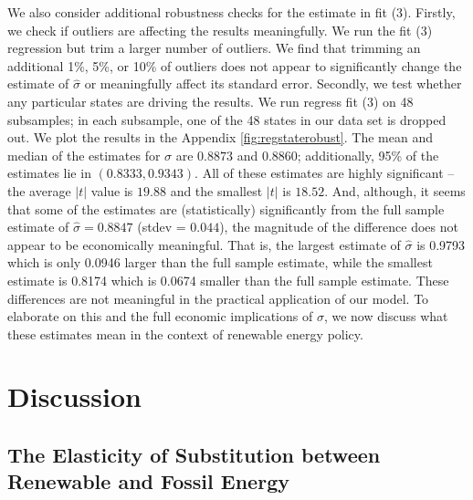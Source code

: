 \documentclass[11pt,a4paper,leqno]{extarticle}
\providecommand{\DIFdelend}{} %
\begin{document}
	\DIFdelend We also consider additional robustness checks for the estimate in fit (3). Firstly, we check if outliers are affecting the results meaningfully. We run the fit (3) regression but trim a larger number of outliers. We find that trimming an additional 1\%, 5\%, or 10\% of outliers does not appear to significantly change the estimate of $\hat{\sigma}$ or meaningfully affect its standard error. Secondly, we test whether any particular states are driving the results. We run regress fit (3) on 48 subsamples; in each subsample, one of the 48 states in our data set is dropped out. We plot the results in the Appendix \autoref{fig:regstaterobust}. The mean and median of the estimates for $\sigma$ are  $0.8873$ and $0.8860$; additionally, 95\% of the estimates lie in $(0.8333, 0.9343)$. All of these estimates are highly significant -- the average $|t|$ value is $19.88$ and the smallest $|t|$ is $18.52$. And, although, it seems that some of the estimates are (statistically) significantly  from the full sample estimate of $\hat{\sigma} = 0.8847$ (stdev = $0.044$), the magnitude of the difference does not appear to be economically meaningful. That is, the largest estimate of $\hat{\sigma}$ is 0.9793 which is only 0.0946 larger than the full sample estimate, while the smallest estimate is 0.8174 which is 0.0674 smaller than the full sample estimate. These differences are not meaningful in the practical application of our model. To elaborate on this and the full economic implications of $\sigma$, we now discuss what these estimates mean in the context of renewable energy policy.
	
	
	
	
	\clearpage
	\section{Discussion}
	\label{sec:Discussion}
	
	\subsection{The Elasticity of Substitution between Renewable and Fossil Energy}
	
\end{document}
